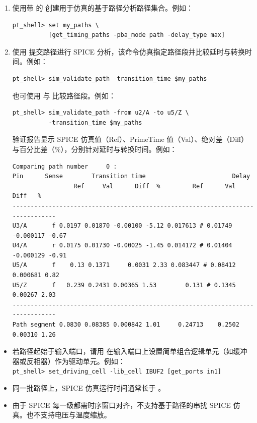 \begin{enumerate}
  \item 使用带  的  创建用于仿真的基于路径分析路径集合。例如：
\begin{lstlisting}
pt_shell> set my_paths \
          [get_timing_paths -pba_mode path -delay_type max]
\end{lstlisting}

  \item 使用  提交路径进行 SPICE 分析，该命令仿真指定路径段并比较延时与转换时间。例如：
\begin{lstlisting}
pt_shell> sim_validate_path -transition_time $my_paths
\end{lstlisting}

        也可使用  与  比较路径段。例如：
\begin{lstlisting}
pt_shell> sim_validate_path -from u2/A -to u5/Z \
          -transition_time $my_paths
\end{lstlisting}

        验证报告显示 SPICE 仿真值（Ref）、PrimeTime 值（Val）、绝对差（Diff）与百分比差（\%），分别针对延时与转换时间。例如：
\begin{lstlisting}
Comparing path number     0 :
Pin      Sense        Transition time                        Delay
                 Ref     Val      Diff  %         Ref      Val       Diff   %
-------------------------------------------------------------------------------
U3/A       f 0.0197 0.01870 -0.00100 -5.12 0.017613 # 0.01749 -0.000117 -0.67
U4/A       r 0.0175 0.01730 -0.00025 -1.45 0.014172 # 0.01404 -0.000129 -0.91
U5/A       f    0.13 0.1371     0.0031 2.33 0.083447 # 0.08412 0.000681 0.82
U5/Z       f   0.239 0.2431 0.00365 1.53        0.131 # 0.1345     0.00267 2.03
-------------------------------------------------------------------------------
Path segment 0.0830 0.08385 0.000842 1.01     0.24713    0.2502    0.00310 1.26
\end{lstlisting}
\end{enumerate}

\begin{noteBox}
\begin{itemize}
  \item 若路径起始于输入端口，请用  在输入端口上设置简单组合逻辑单元（如缓冲器或反相器）作为驱动单元。例如：\\
        \texttt{pt\_shell> set\_driving\_cell -lib\_cell IBUF2 [get\_ports in1]}
  \item 同一批路径上，SPICE 仿真运行时间通常长于 \cmd{report\_timing}。
  \item 由于 SPICE 每一级都需时序窗口对齐，不支持基于路径的串扰 SPICE 仿真。也不支持电压与温度缩放。
\end{itemize}
\end{noteBox}

